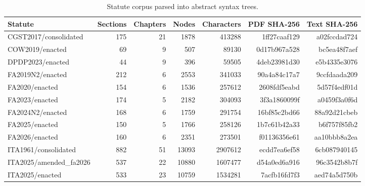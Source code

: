 \begin{table}[t]
\centering\small
\caption{Statute corpus parsed into abstract syntax trees.}
\label{tab:corpus}
\begin{tabular}{lrrrrrr}
\toprule
Statute & Sections & Chapters & Nodes & Characters & PDF SHA-256 & Text SHA-256 \\
\midrule
CGST2017/consolidated & 175 & 21 & 1878 & 413288 & 1ff27caaf129 & a02fccdad724 \\
COW2019/enacted & 69 & 9 & 507 & 89130 & 0d17b967a528 & bc5ea48f7aef \\
DPDP2023/enacted & 44 & 9 & 396 & 59505 & 4deb23981d30 & e5b4335e3076 \\
FA2019N2/enacted & 212 & 6 & 2553 & 341033 & 90a4a84c17a7 & 9ccfdaada209 \\
FA2020/enacted & 154 & 6 & 1536 & 257612 & 2608fdf5eabd & 5d57f4edf01d \\
FA2023/enacted & 174 & 5 & 2182 & 304093 & 3f3a1860099f & a0459f3a0f6d \\
FA2024N2/enacted & 168 & 6 & 1759 & 291754 & 16bf85c2bd66 & 88a92d21cbeb \\
FA2025/enacted & 150 & 5 & 1766 & 258126 & 1b7c61b42a33 & b6f757f85fb2 \\
FA2026/enacted & 160 & 6 & 2351 & 273501 & f01136356e61 & aa10bbb8a2ea \\
ITA1961/consolidated & 882 & 51 & 13093 & 2907612 & ecdd7ea6ef58 & 6cb087940145 \\
ITA2025/amended\_fa2026 & 537 & 22 & 10880 & 1607477 & d54a0ed6a916 & 96c3542b8b7f \\
ITA2025/enacted & 533 & 23 & 10759 & 1534281 & 7acfb16fd7f3 & aed74a5d750b \\
\bottomrule
\end{tabular}
\end{table}
